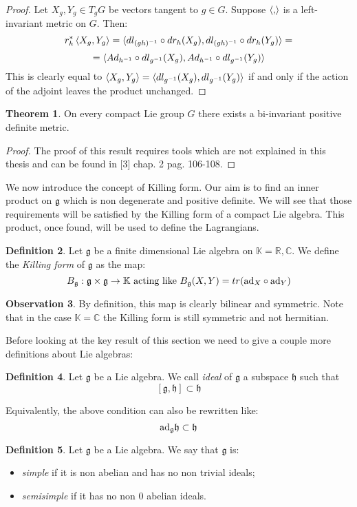\documentclass[12pt,a4paper]{report}
\theoremstyle{definition}
\newtheorem{Def}{Definition}[chapter]
\theoremstyle{Theorem}
\newtheorem{Theo}[Def]{Theorem}
\theoremstyle{definition}
\theoremstyle{definition}
\newtheorem{Obs}[Def]{Observation}
\begin{document}
			\begin{proof}
				Let $X_g,Y_g\in T_gG$ be vectors tangent to $g\in G$. Suppose $\braket{,}$ is a left-invariant metric on $G$. Then:
				$$r_h^*\braket{X_g,Y_g}=\braket{dl_{(gh)^{-1}}\circ dr_h(X_g),dl_{(gh)^{-1}}\circ dr_h(Y_g)}=$$
				$$=\braket{Ad_{h^{-1}}\circ dl_{g^{-1}}(X_g),Ad_{h^{-1}}\circ dl_{g^{-1}}(Y_g)}$$
				This is clearly equal to $\braket{X_g,Y_g}=\braket{dl_{g^{-1}}(X_g),dl_{g^{-1}}(Y_g)}$ if and only if the action of the adjoint leaves the product unchanged.
			\end{proof}
			\begin{Theo} \label{Scal_prod_theo_1}
				On every compact Lie group $G$ there exists a bi-invariant positive definite metric.
			\end{Theo}
			\begin{proof}
				The proof of this result requires tools which are not explained in this thesis and can be found in [3] chap. 2 pag. 106-108.
			\end{proof}
			We now introduce the concept of Killing form. Our aim is to find an inner product on $\mathfrak{g}$ which is non degenerate and positive definite. We will see that those requirements will be satisfied by the Killing form of a compact Lie algebra. This product, once found, will be used to define the Lagrangians.
			\begin{Def}
				Let $\mathfrak{g}$ be a finite dimensional Lie algebra on $\mathbb{K}=\mathbb{R},\mathbb{C}$. We define the \textit{Killing form} of $\mathfrak{g}$ as the map:
				$$B_\mathfrak{g}:\mathfrak{g}\times \mathfrak{g}\rightarrow\mathbb{K}\hbox{ acting like } B_\mathfrak{g}(X,Y)=tr(\hbox{ad}_X\circ \hbox{ad}_Y)$$
			\end{Def}
			\begin{Obs}
				By definition, this map is clearly bilinear and symmetric. Note that in the case $\mathbb{K}=\mathbb{C}$ the Killing form is still symmetric and not hermitian.
			\end{Obs} 
			Before looking at the key result of this section we need to give a couple more definitions about Lie algebras:
			\begin{Def}
				Let $\mathfrak{g}$ be a Lie algebra. We call \textit{ideal} of $\mathfrak{g}$ a subspace $\mathfrak{h}$ such that 
				$$[\mathfrak{g},\mathfrak{h}]\subset\mathfrak{h}$$
			\end{Def}
			Equivalently, the above condition can also be rewritten like:
			$$\hbox{ad}_\mathfrak{g}\mathfrak{h}\subset\mathfrak{h}$$
			\begin{Def}
				Let $\mathfrak{g}$ be a Lie algebra. We say that $\mathfrak{g}$ is:
				\begin{itemize}
					\item \textit{simple} if it is non abelian and has no non trivial ideals;
					\item \textit{semisimple} if it has no non 0 abelian ideals.
				\end{itemize}
			\end{Def}
\end{document}
